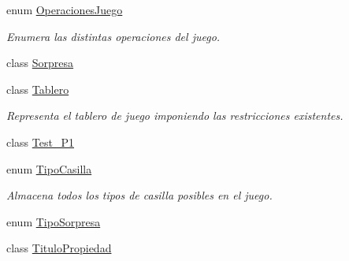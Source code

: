 \begin{DoxyCompactItemize}
enum \hyperlink{enumcivitas_1_1OperacionesJuego}{Operaciones\+Juego}
\begin{DoxyCompactList}\small\item\em Enumera las distintas operaciones del juego. \end{DoxyCompactList}\item 
class \hyperlink{classcivitas_1_1Sorpresa}{Sorpresa}
\item 
class \hyperlink{classcivitas_1_1Tablero}{Tablero}
\begin{DoxyCompactList}\small\item\em Representa el tablero de juego imponiendo las restricciones existentes. \end{DoxyCompactList}\item 
class \hyperlink{classcivitas_1_1Test__P1}{Test\+\_\+\+P1}
\item 
enum \hyperlink{enumcivitas_1_1TipoCasilla}{Tipo\+Casilla}
\begin{DoxyCompactList}\small\item\em Almacena todos los tipos de casilla posibles en el juego. \end{DoxyCompactList}\item 
enum \hyperlink{enumcivitas_1_1TipoSorpresa}{Tipo\+Sorpresa}
\item 
class \hyperlink{classcivitas_1_1TituloPropiedad}{Titulo\+Propiedad}
\end{DoxyCompactItemize}
